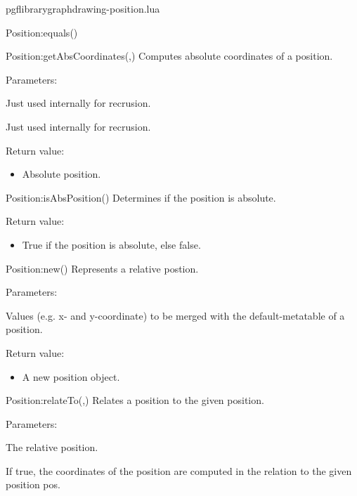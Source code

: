\begin{filedescription}{pgflibrarygraphdrawing-position.lua}
\begin{luacommand}{{Position:equals}()}
\end{luacommand}\begin{luacommand}{{Position:getAbsCoordinates}(,)}
Computes absolute coordinates of a position.

Parameters:
\begin{parameterdescription}
	\item[\meta{x}] Just used internally for recrusion.\item[\meta{y}] Just used internally for recrusion.
\end{parameterdescription}


Return value:
\begin{itemize} \item[] Absolute position. \end{itemize}


\end{luacommand}\begin{luacommand}{{Position:isAbsPosition}()}
Determines if the position is absolute.


Return value:
\begin{itemize} \item[] True if the position is absolute, else false. \end{itemize}


\end{luacommand}\begin{luacommand}{{Position:new}()}
Represents a relative postion.

Parameters:
\begin{parameterdescription}
	\item[\meta{values}] Values (e.g. x- and y-coordinate) to be merged with the default-metatable of a position.
\end{parameterdescription}


Return value:
\begin{itemize} \item[] A new position object. \end{itemize}


\end{luacommand}\begin{luacommand}{{Position:relateTo}(,)}
Relates a position to the given position.

Parameters:
\begin{parameterdescription}
	\item[\meta{pos}] The relative position.\item[\meta{keepAbsPosition}] If true, the coordinates of the position are computed in the relation to the given position pos.
\end{parameterdescription}



\end{luacommand}
\end{filedescription}